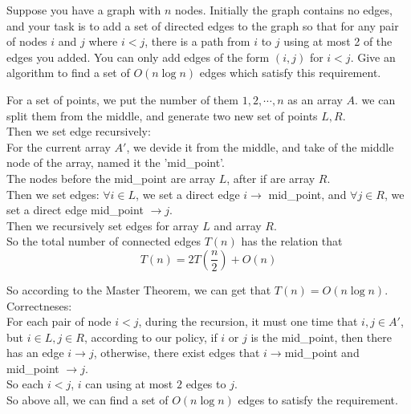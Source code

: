 \problem{}

Suppose you have a graph with $n$ nodes. Initially the graph contains no edges, and your task is to add a set of directed edges to the graph so that for any pair of nodes $i$ and $j$ where $i < j$, there is a path from $i$ to $j$ using at most 2 of the edges you added. You can only add edges of the form $(i,j)$ for $i < j$.  Give an algorithm to find a set of $O(n \log n)$ edges which satisfy this requirement.

\solution{}


For a set of points, we put the number of them $1,2,\cdots, n$ as an array $A$.
we can split them from the middle, and generate two new set of points $L,R$.\\

Then we set edge recursively:\\
For the current array $A'$, we devide it from the middle, and take of the middle node of the array, named it the 'mid\_point'.\\
The nodes before the mid\_point are array $L$, after if are array $R$.\\

Then we set edges: $\forall i\in L$, we set a direct edge $i\to$ mid\_point, and $\forall j\in R$, we set a direct edge  mid\_point $\to j$.\\
Then we recursively set edges for array $L$ and array $R$.\\

So the total number of connected edges $T(n)$ has the relation that 
$$T(n)=2T(\dfrac{n}{2})+O(n)$$

So according to the Master Theorem, we can get that $T(n)=O(n\log n)$.\\

Correctneses:\\
For each pair of node $i<j$, during the recursion, it must one time that $i,j\in A'$, but $i\in L, j\in R$, according to our policy, if $i$ or $j$ is the mid\_point, then there has an edge $i\to j$, otherwise, there exist edges that $i\to$mid\_point and mid\_point $\to j$.\\
So each $i<j$, $i$ can using at most $2$ edges to $j$.\\

So above all, we can find a set of $O(n\log n)$ edges to satisfy the requirement.

\newpage